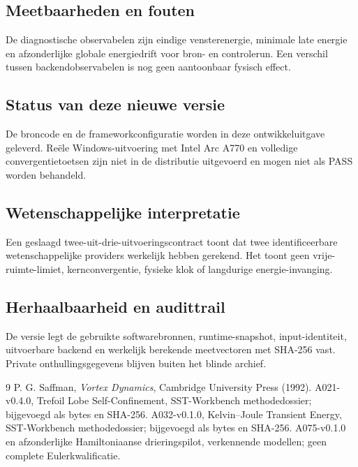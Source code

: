 \documentclass[10pt,a4paper]{article}
\begin{document}
\subsection{Meetbaarheden en fouten}
De diagnostische observabelen zijn eindige vensterenergie, minimale late energie en afzonderlijke globale energiedrift voor bron- en controlerun. Een verschil tussen backendobservabelen is nog geen aantoonbaar fysisch effect.
\subsection{Status van deze nieuwe versie}
De broncode en de frameworkconfiguratie worden in deze ontwikkeluitgave geleverd. Reële Windows-uitvoering met Intel Arc A770 en volledige convergentietoetsen zijn niet in de distributie uitgevoerd en mogen niet als PASS worden behandeld.
\subsection{Wetenschappelijke interpretatie}
Een geslaagd twee-uit-drie-uitvoeringscontract toont dat twee identificeerbare wetenschappelijke providers werkelijk hebben gerekend. Het toont geen vrije-ruimte-limiet, kernconvergentie, fysieke klok of langdurige energie-invanging.
\subsection{Herhaalbaarheid en audittrail}
De versie legt de gebruikte softwarebronnen, runtime-snapshot, input-identiteit, uitvoerbare backend en werkelijk berekende meetvectoren met SHA-256 vast. Private onthullingsgegevens blijven buiten het blinde archief.

\begin{thebibliography}{9}
 P. G. Saffman, \emph{Vortex Dynamics}, Cambridge University Press (1992).
 A021-v0.4.0, Trefoil Lobe Self-Confinement, SST-Workbench methodedossier; bijgevoegd als bytes en SHA-256.
 A032-v0.1.0, Kelvin--Joule Transient Energy, SST-Workbench methodedossier; bijgevoegd als bytes en SHA-256.
 A075-v0.1.0 en afzonderlijke Hamiltoniaanse drieringspilot, verkennende modellen; geen complete Eulerkwalificatie.
\end{thebibliography}
\end{document}
